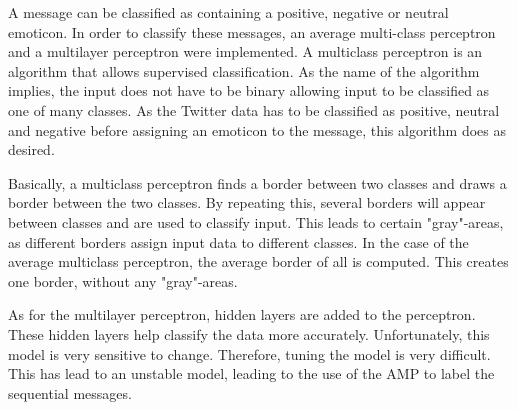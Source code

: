 A message can be classified as containing a positive, negative or neutral emoticon. In order to classify these messages, an average multi-class perceptron and a multilayer perceptron were implemented. A multiclass perceptron is an algorithm that allows supervised classification. As the name of the algorithm implies, the input does not have to be binary allowing input to be classified as one of many classes. As the Twitter data has to be classified as positive, neutral and negative before assigning an emoticon to the message, this algorithm does as desired. 

Basically, a multiclass perceptron finds a border between two classes and draws a border between the two classes. By repeating this, several borders will appear between classes and are used to classify input. This leads to certain "gray"-areas, as different borders assign input data to different classes. In the case of the average multiclass perceptron, the average border of all is computed. This creates one border, without any "gray"-areas.

As for the multilayer perceptron, hidden layers are added to the perceptron. These hidden layers help classify the data more accurately. Unfortunately, this model is very sensitive to change. Therefore, tuning the model is very difficult. This has lead to an unstable model, leading to the use of the AMP to label the sequential messages.